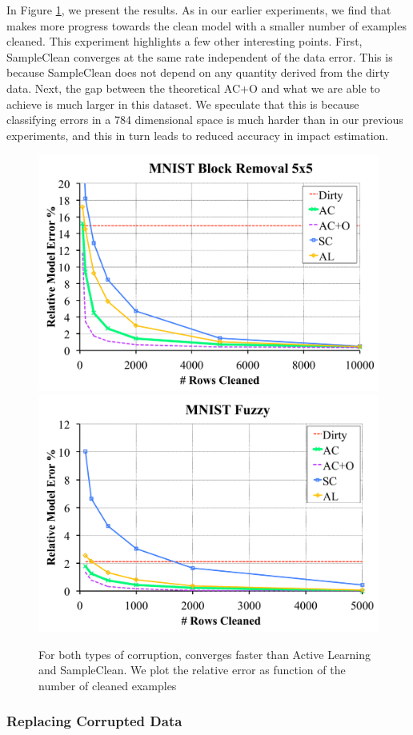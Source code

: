 In Figure \ref{mnist}, we present the results.
As in our earlier experiments, we find that \sys makes more progress towards the clean model with a smaller number of examples cleaned.
This experiment highlights a few other interesting points.
First, SampleClean converges at the same rate independent of the data error.
This is because SampleClean does not depend on any quantity derived from the dirty data.
Next, the gap between the theoretical AC+O and what we are able to achieve is much larger in this dataset.
We speculate that this is because classifying errors in a 784 dimensional space is much harder than in our previous experiments, and this in turn leads to reduced accuracy in impact estimation.


\begin{figure}[ht]
\centering
 \includegraphics[scale=0.16]{exp/exp7a.pdf}
 \includegraphics[scale=0.16]{exp/exp7b.pdf}
 \caption{For both types of corruption, \sys converges faster than Active Learning and SampleClean. We plot the relative error as function of the number of cleaned examples \label{mnist}}
\end{figure}

\subsubsection{Replacing Corrupted Data}
